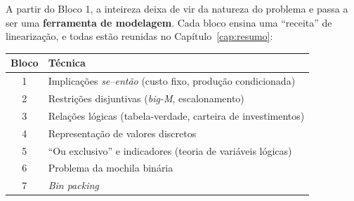 A partir do Bloco 1, a inteireza deixa de vir da natureza do problema e passa a ser uma \textbf{ferramenta de
modelagem}. Cada bloco ensina uma ``receita'' de linearização, e todas estão reunidas no
Capítulo~\ref{cap:resumo}:

\begin{center}
\begin{tabular}{cl}
\toprule
Bloco & Técnica\\
\midrule
1 & Implicações \emph{se--então} (custo fixo, produção condicionada)\\
2 & Restrições disjuntivas (\emph{big-M}, escalonamento)\\
3 & Relações lógicas (tabela-verdade, carteira de investimentos)\\
4 & Representação de valores discretos\\
5 & ``Ou exclusivo'' e indicadores (teoria de variáveis lógicas)\\
6 & Problema da mochila binária\\
7 & \emph{Bin packing}\\
\bottomrule
\end{tabular}
\end{center}
